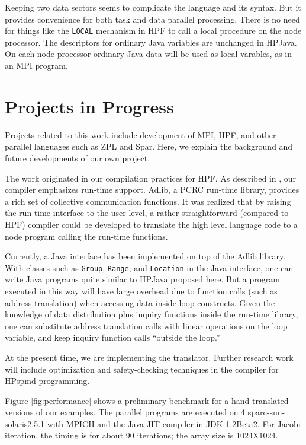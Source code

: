Keeping two data sectors seems to complicate the language and its
syntax.  But it provides convenience for both task and data parallel
processing.  There is no need for things like the \texttt{LOCAL}
mechanism in HPF to call a local procedure on the node processor.  The
descriptors for ordinary Java variables are unchanged in HPJava.  On
each node processor ordinary Java data will be used as local varables,
as in an MPI program.


\section{Projects in Progress\label{sec:progress}}

Projects related to this work include development of MPI, HPF,
and other parallel languages such as ZPL\cite{ZPL} and Spar\cite{Spar}.
Here, we explain the background and future developments of our own
project.

The work originated in our compilation practices for HPF. As described
in \cite{Zha97}, our compiler emphasizes run-time support.
Adlib\cite{Car98}, a PCRC run-time library, provides a
rich set of collective communication functions.  It was realized that
by raising the run-time interface to the user level, a rather
straightforward (compared to HPF) compiler could be developed to
translate the high level language code to a node program calling the
run-time functions.

Currently, a Java interface has been implemented on top of the Adlib
library.  With classes such as \texttt{Group}, \texttt{Range}, and
\texttt{Location} in the Java interface, one can write Java programs
quite similar to HPJava proposed here. But a program executed in
this way will have large overhead due to function calls (such as
address translation) when accessing data inside loop constructs.
Given the knowledge of data distribution plus inquiry functions inside
the run-time library, one can substitute address translation calls with
linear operations on the loop variable, and keep inquiry
function calls ``outside the loop.'' 

At the present time, we are implementing the translator.  Further
research work will include optimization and safety-checking techniques
in the compiler for HPspmd programming.

Figure \ref{fig:performance} shows a preliminary benchmark for a hand-translated 
versions of our examples. The parallel programs are executed
on 4 sparc-sun-solaris2.5.1 with MPICH and the Java JIT compiler in
JDK 1.2Beta2. For Jacobi iteration, the timing is for about 90
iterations; the array size is 1024X1024.

